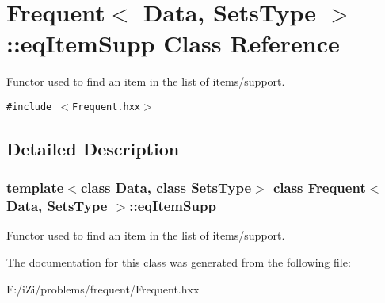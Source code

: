\section{Frequent$<$ Data, Sets\-Type $>$::eq\-Item\-Supp Class Reference}
\label{class_frequent_1_1eq_item_supp}
Functor used to find an item in the list of items/support.  


{\tt \#include $<$Frequent.hxx$>$}



\subsection{Detailed Description}
\subsubsection*{template$<$class Data, class Sets\-Type$>$ class Frequent$<$ Data, Sets\-Type $>$::eq\-Item\-Supp}

Functor used to find an item in the list of items/support. 



The documentation for this class was generated from the following file:\begin{CompactItemize}
\item 
F:/i\-Zi/problems/frequent/Frequent.hxx\end{CompactItemize}
